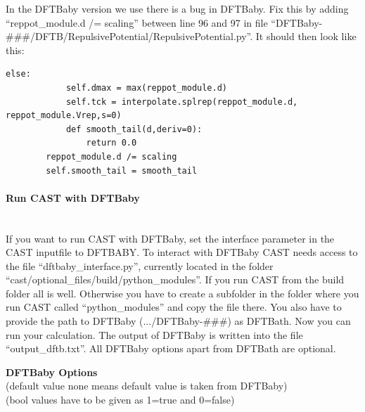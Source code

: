 \documentclass[10pt,a4paper]{article} %
\begin{document}
In the DFTBaby version we use there is a bug in DFTBaby. Fix this by adding ``reppot\_module.d /= scaling'' between line 96 and 97 in file ``DFTBaby-\#\#\#/DFTB/RepulsivePotential/RepulsivePotential.py''. It should then look like this:
\begin{lstlisting}[firstnumber=92]
        else:
            self.dmax = max(reppot_module.d)
            self.tck = interpolate.splrep(reppot_module.d, reppot_module.Vrep,s=0)
            def smooth_tail(d,deriv=0):
                return 0.0
        reppot_module.d /= scaling
        self.smooth_tail = smooth_tail
\end{lstlisting}

\paragraph{Run CAST with DFTBaby}\mbox{}\\

If you want to run CAST with DFTBaby, set the interface parameter in the CAST inputfile to DFTBABY. To interact with DFTBaby CAST needs access to the file ``dftbaby\_interface.py'', currently located in the folder ``cast/optional\_files/build/python\_modules''. If you run CAST from the build folder all is well. Otherwise you have to create a subfolder in the folder where you run CAST called ``python\_modules'' and copy the file there. You also have to provide the path to DFTBaby (.../DFTBaby-\#\#\#) as DFTBath. Now you can run your calculation. The output of DFTBaby is written into the file ``output\_dftb.txt''. All DFTBaby options apart from DFTBath are optional. 


\textbf{DFTBaby Options} 
\\(default value none means default value is taken from DFTBaby)
\\(bool values have to be given as 1=true and 0=false)
\end{document}
